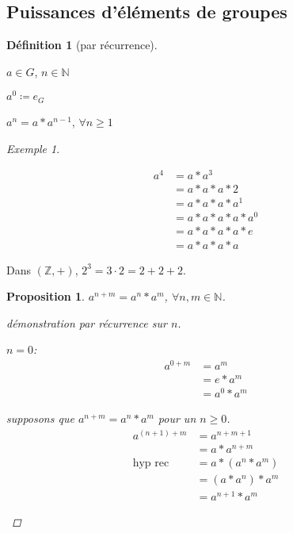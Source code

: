 \documentclass{report}
\newcommand*{\entiers}{\mathbb{Z}}
\newcommand*{\naturels}{\mathbb{N}}
\newtheorem*{prop}{Proposition}
\theoremstyle{definition}
\newtheorem*{defin}{D\'efinition}
\theoremstyle{remark}
\newtheorem*{exem}{Exemple}
\begin{document}
	\subsection{Puissances d'\'el\'ements de groupes}
	\begin{defin}[par r\'ecurrence]~

		$a \in G$, $n \in \naturels$
		\begin{nlist}
			\item $a^0 \coloneq e_G$
			\item $a^n=a*a^{n-1}$, $\forall n \geq 1$
		\end{nlist}
	\end{defin}
	\begin{exem}~

		\begin{ulist}
			\item \begin{align*}
				a^4&= a*a^3\\
				&= a*a*a*2\\
				&= a*a*a*a^1\\
				&= a*a*a*a*a^0\\
				&= a*a*a*a*e\\
				&= a*a*a*a
			\end{align*}
			\item Dans $(\entiers,+)$, $2^3=3 \cdot 2=2+2+2$.
		\end{ulist}
	\end{exem}
	\begin{prop}
		$a^{n+m}=a^n*a^m$, $\forall n,m \in \naturels$.
		\begin{proof}[d\'emonstration par r\'ecurrence sur $n$]~

			\begin{nlist}
				\item $n=0$:
				\begin{align*}
					a^{0+m}&= a^m\\
					&= e*a^m\\
					&= a^0*a^m
				\end{align*}
				\item supposons que $a^{n+m}=a^n*a^m$ pour un $n \geq 0$.
				\begin{align*}
					a^{(n+1)+m}&= a^{n+m+1}\\
					&= a*a^{n+m}\\
					\text{hyp rec}&= a*(a^n*a^m)\\
					&= (a*a^n)*a^m\\
					&= a^{n+1}*a^m
				\end{align*}
			\end{nlist}
		\end{proof}
	\end{prop}
\end{document}
